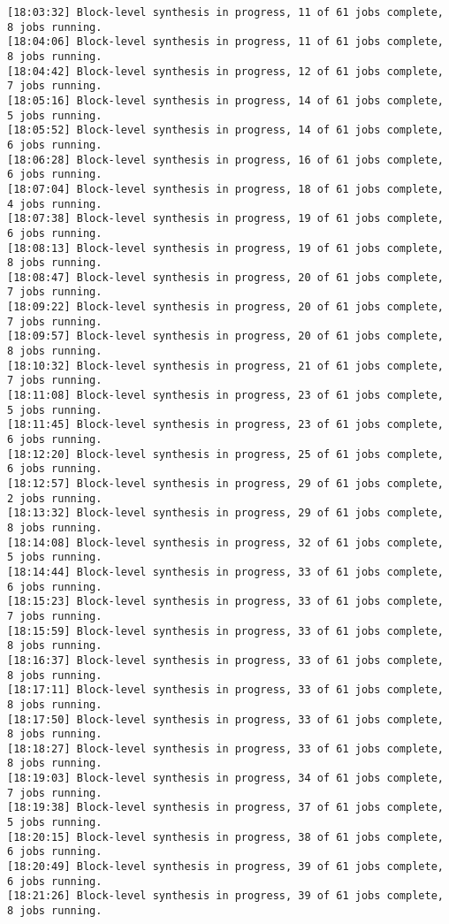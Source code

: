 \begin{center}
\begin{lstlisting}[label=lst:vlog,caption=Файл v++\_vinc.log]
[18:03:32] Block-level synthesis in progress, 11 of 61 jobs complete, 8 jobs running.
[18:04:06] Block-level synthesis in progress, 11 of 61 jobs complete, 8 jobs running.
[18:04:42] Block-level synthesis in progress, 12 of 61 jobs complete, 7 jobs running.
[18:05:16] Block-level synthesis in progress, 14 of 61 jobs complete, 5 jobs running.
[18:05:52] Block-level synthesis in progress, 14 of 61 jobs complete, 6 jobs running.
[18:06:28] Block-level synthesis in progress, 16 of 61 jobs complete, 6 jobs running.
[18:07:04] Block-level synthesis in progress, 18 of 61 jobs complete, 4 jobs running.
[18:07:38] Block-level synthesis in progress, 19 of 61 jobs complete, 6 jobs running.
[18:08:13] Block-level synthesis in progress, 19 of 61 jobs complete, 8 jobs running.
[18:08:47] Block-level synthesis in progress, 20 of 61 jobs complete, 7 jobs running.
[18:09:22] Block-level synthesis in progress, 20 of 61 jobs complete, 7 jobs running.
[18:09:57] Block-level synthesis in progress, 20 of 61 jobs complete, 8 jobs running.
[18:10:32] Block-level synthesis in progress, 21 of 61 jobs complete, 7 jobs running.
[18:11:08] Block-level synthesis in progress, 23 of 61 jobs complete, 5 jobs running.
[18:11:45] Block-level synthesis in progress, 23 of 61 jobs complete, 6 jobs running.
[18:12:20] Block-level synthesis in progress, 25 of 61 jobs complete, 6 jobs running.
[18:12:57] Block-level synthesis in progress, 29 of 61 jobs complete, 2 jobs running.
[18:13:32] Block-level synthesis in progress, 29 of 61 jobs complete, 8 jobs running.
[18:14:08] Block-level synthesis in progress, 32 of 61 jobs complete, 5 jobs running.
[18:14:44] Block-level synthesis in progress, 33 of 61 jobs complete, 6 jobs running.
[18:15:23] Block-level synthesis in progress, 33 of 61 jobs complete, 7 jobs running.
[18:15:59] Block-level synthesis in progress, 33 of 61 jobs complete, 8 jobs running.
[18:16:37] Block-level synthesis in progress, 33 of 61 jobs complete, 8 jobs running.
[18:17:11] Block-level synthesis in progress, 33 of 61 jobs complete, 8 jobs running.
[18:17:50] Block-level synthesis in progress, 33 of 61 jobs complete, 8 jobs running.
[18:18:27] Block-level synthesis in progress, 33 of 61 jobs complete, 8 jobs running.
[18:19:03] Block-level synthesis in progress, 34 of 61 jobs complete, 7 jobs running.
[18:19:38] Block-level synthesis in progress, 37 of 61 jobs complete, 5 jobs running.
[18:20:15] Block-level synthesis in progress, 38 of 61 jobs complete, 6 jobs running.
[18:20:49] Block-level synthesis in progress, 39 of 61 jobs complete, 6 jobs running.
[18:21:26] Block-level synthesis in progress, 39 of 61 jobs complete, 8 jobs running.

\end{lstlisting}
\end{center}
